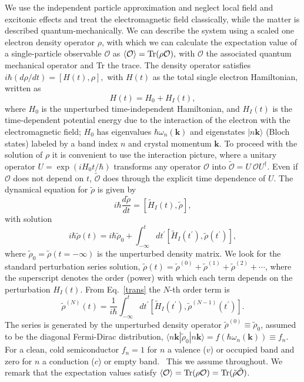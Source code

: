 \documentclass[floatfix,prb,aps,superscriptaddress,11pt]{revtex4}
\begin{document}
We use the independent particle approximation and neglect local field
and excitonic effects and
treat the electromagnetic field classically, while the matter is
described quantum-mechanically.
We can describe the system using a scaled one electron density
operator ${\rho}$, with which we can calculate the expectation value of a
single-particle observable $\mathcal{O}$ as 
$\langle{\cal O}\rangle=\mbox{Tr}({\rho} {\cal O}),  
\label{calo}$
with $\mathcal{O}$ the associated quantum mechanical operator and Tr
the trace. 
The density operator satisfies
$
i\hbar (d{\rho}/dt)=[H(t),{\rho}],  
\label{rho}
$
with $H(t)$ as the total single electron Hamiltonian, written as 
\begin{equation*}
H(t)=H_{0}+H_{I}(t),  
\label{ache}
\end{equation*}
where $H_{0}$ is the unperturbed time-independent Hamiltonian, and $H_{I}(t)$
is the time-dependent potential energy due to the interaction of the
electron with the electromagnetic field; $H_{0}$ has eigenvalues
$\hbar \omega_{n}(\mathbf{k})$
and eigenstates $| n\mathbf{k} \rangle$ (Bloch states) labeled by a band 
index $n$ and crystal momentum $\mathbf{k}$.
To proceed with the solution of $\rho$  it is convenient to use the
interaction picture, where a unitary operator $U=\exp ({iH_{0}t/\hbar })$
transforms any operator $\mathcal{O}$ into $\tilde{\mathcal{O}}=U\mathcal{\ O
}U^{\dagger }$. Even if $\mathcal{O}$ does not depend on $t$, $\tilde{
\mathcal{O}}$ does through the explicit time dependence of $U$. 
The dynamical 
equation for $\tilde{\rho}$ is 
given by
\begin{equation*}
i\hbar \frac{d\tilde{{\rho}}}{dt}=[\tilde{H}_{I}(t),\tilde{{\rho}}],  
\label{rho1}
\end{equation*}
with solution 
\begin{equation}
i\hbar \tilde{{\rho}}(t)=i\hbar \tilde{{\rho}}_{0}+\int_{-\infty }^{t}dt^{\prime }[
\tilde{H}_{I}(t^{\prime }),\tilde{\rho}(t^{\prime })],  
\label{trans}
\end{equation}
where $\tilde{\rho}_{0}=\tilde{\rho}(t=-\infty )$ is the unperturbed density matrix. We look
for the standard perturbation series solution, 
$\tilde{\rho}(t)=\tilde{\rho}^{(0)}+\tilde{\rho}^{(1)}+\tilde{\rho}^{(2)}+\cdots$,  
where the superscript denotes the order (power) with which each term depends
on the perturbation $H_{I}(t)$. From Eq.~\eqref{trans} the $N$-th order
term is 
\begin{equation}
\tilde{{\rho}}^{(N)}(t)=\frac{1}{i\hbar }\int_{-\infty }^{t}dt^{\prime }[\tilde{
H}_{I}(t^{\prime }),\tilde{\rho}^{(N-1)}(t^{\prime })].  
\label{rhop}
\end{equation}
The series is generated by the unperturbed density operator $\tilde{\rho}
^{(0)}\equiv \tilde{\rho}_{0}$, assumed to be the diagonal Fermi-Dirac distribution, 
$\langle n\mathbf{k}|\tilde{\rho}_{0}|n\mathbf{k}\rangle=f(\hbar \omega_{n}(\mathbf{k}))\equiv f_{n}$. For a
clean, cold semiconductor $f_{n}=1$ for $n$ a valence ($v$) or
occupied band and zero for $n$ a conduction ($c$) or empty band. \ This we
assume throughout.
We remark that the expectation values satisfy
$
\langle{\cal O}\rangle=
\mbox{Tr}({\rho}{\cal O})
=
\mbox{Tr}(\tilde{{\rho}}\tilde{\cal O})
$.  
\end{document}
